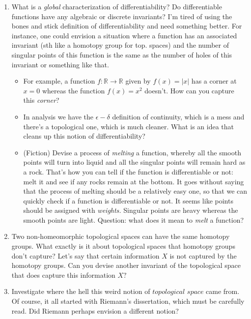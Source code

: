 \documentclass[12pt]{article}
\newcommand{\rr}{\mathbb{R}}
\theoremstyle{definition}
\begin{document}
\begin{enumerate}
    \item What is a \textit{global} characterization of differentiability? Do differentiable functions have any algebraic or discrete invariants? I'm tired of using the bones and stick definition of differentiability and need something better. For instance, one could envision a situation where a function has an associated invariant (sth like a homotopy group for top. spaces) and the number of singular points of this function is the same as the number of holes of this invariant or something like that.
    \begin{itemize}
    
    \item For example, a function $f: \rr \to \rr$ given by $f(x) = |x|$ has a corner at $x = 0$ whereas the function $f(x) = x^2$ doesn't. How can you capture this \textit{corner}?

    \item In analysis we have the $\epsilon - \delta$ definition of continuity, which is a mess and there's a topological one, which is much cleaner. What is an idea that cleans up this notion of differentiability?

    \item (Fiction) Devise a process of \textit{melting} a function, whereby all the smooth points will turn into liquid and all the singular points will remain hard as a rock. That's how you can tell if the function is differentiable or not: melt it and see if any rocks remain at the bottom. It goes without saying that the process of melting should be a relatively easy one, so that we can quickly check if a function is differentiable or not. It seems like points should be assigned with \textit{weights.} Singular points are heavy whereas the smooth points are light. Question: what does it mean to \textit{melt} a function?
    \end{itemize}

\item Two non-homeomorphic topological spaces can have the same homotopy groups. What exactly is it about topological spaces that homotopy groups don't capture? Let's say that certain information $X$ is not captured by the homotopy groups. Can you devise another invariant of the topological space that does capture this information $X?$

\item Investigate where the hell this weird notion of $topological$ $space$ came from. Of course, it all started with Riemann's dissertation, which must be carefully read. Did Riemann perhaps envision a different notion? 


\end{enumerate}
\end{document}
